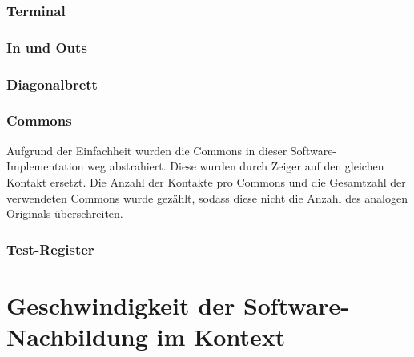 \subsection{Terminal}\label{subsec:impl_terminal}


\subsection{In und Outs}\label{subsec:impl_in_und_outs}
\subsection{Diagonalbrett}\label{subsec:impl_diagonal_board}
\subsection{Commons}\label{subsec:impl_commons}
Aufgrund der Einfachheit wurden die Commons in dieser Software-Implementation \glqq weg abstrahiert\grqq. 
Diese wurden durch Zeiger auf den gleichen Kontakt ersetzt.
Die Anzahl der Kontakte pro Commons und die Gesamtzahl der verwendeten Commons wurde gezählt, sodass diese nicht die Anzahl des analogen Originals überschreiten.
\subsection{Test-Register}\label{subsec:impl_test-register}

\chapter{Geschwindigkeit der Software-Nachbildung im Kontext}
